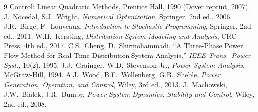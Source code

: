 \documentclass[11pt]{report}
\theoremstyle{plain}
\theoremstyle{definition}
\theoremstyle{remark}
\begin{document}
\begin{thebibliography}{9}
{  Control: Linear Quadratic Methods}, Prentice Hall, 1990 (Dover
  reprint, 2007).
 J.~Nocedal, S.J.~Wright, \emph{Numerical
  Optimization}, Springer, 2nd ed., 2006.
 J.R.~Birge, F.~Louveaux, \emph{Introduction to
  Stochastic Programming}, Springer, 2nd ed., 2011.
 W.H.~Kersting, \emph{Distribution System Modeling
  and Analysis}, CRC Press, 4th ed., 2017.
 C.S.~Cheng, D.~Shirmohammadi, ``A
  Three-Phase Power Flow Method for Real-Time Distribution System
  Analysis,'' \emph{IEEE Trans.\ Power Syst.}, 10(2), 1995.
 J.J.~Grainger, W.D.~Stevenson Jr.,
  \emph{Power System Analysis}, McGraw-Hill, 1994.
 A.J.~Wood, B.F.~Wollenberg, G.B.~Sheble,
  \emph{Power Generation, Operation, and Control}, Wiley, 3rd ed., 2013.
 J.~Machowski, J.W.~Bialek, J.R.~Bumby, \emph{Power
  System Dynamics: Stability and Control}, Wiley, 2nd ed., 2008.
\end{thebibliography}
\end{document}

